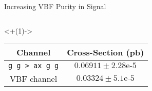 \documentclass[]{beamer}
\begin{document}
\begin{frame}{Increasing VBF Purity in Signal}
\begin{columns}
\begin{column}{0.45\linewidth}
            \centering
            \uncover<+(1)->{
                \begin{tabular}{|c|c|}
                    \hline
                    Channel & Cross-Section (pb) \\
                    \hline
                    \hline
                    \texttt{g g > ax g g} & $0.06911 \pm 2.28\text{e-}5$\\
                    VBF channel & $0.03324 \pm 5.1\text{e-}5$\\
                    \hline
                \end{tabular}
            }
        \end{column}
    \end{columns}
\end{frame}

\end{document}
